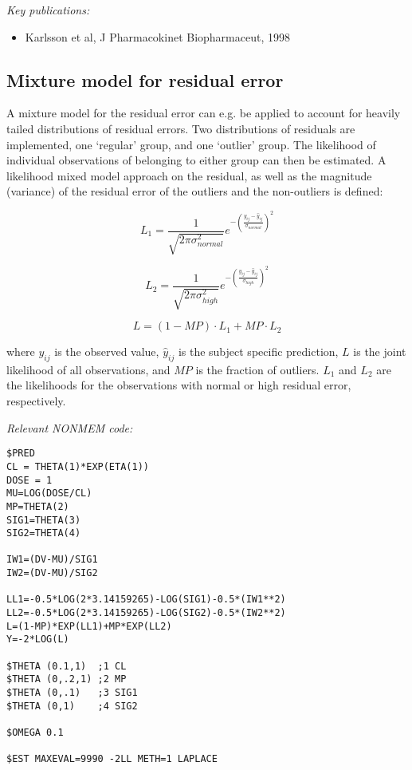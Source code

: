 \documentclass[a4paper,11pt]{article}
\begin{document}
\noindent \emph{Key publications:}
\begin{itemize}
\item Karlsson et al, J Pharmacokinet Biopharmaceut, 1998
\end{itemize}

\subsection{Mixture model for residual error}
A mixture model for the residual error can e.g. be applied to account
for heavily tailed distributions of residual errors. Two distributions
of residuals are implemented, one `regular' group, and one `outlier'
group. The likelihood of individual observations of belonging to
either group can then be estimated. A likelihood mixed model approach
on the residual, as well as the magnitude (variance) of the residual
error of the outliers and the non-outliers is defined:

\begin{equation}
L_1 = \frac{1}{\sqrt{2 \pi {\sigma^2_{normal}}}} e^{-{\left(\frac{y_{ij} - \hat{y}_{ij}}{\sigma_{normal}} \right)}^2}
\end{equation}

\begin{equation}
L_2 = \frac{1}{\sqrt{2 \pi {\sigma^2_{high}}}} e^{-{\left(\frac{y_{ij} - \hat{y}_{ij}}{\sigma_{high}} \right)}^2}
\end{equation}

\begin{equation}
L = (1-MP) \cdot L_1 + MP \cdot L_2
\end{equation}

where $y_{ij}$ is the observed value, $\hat{y}_{ij}$ is the subject specific prediction, $L$ is the joint
likelihood of all observations, and $MP$ is the fraction of outliers. $L_1$ and $L_2$ are the
likelihoods for the observations with normal or high residual error, respectively.

\noindent \emph{Relevant NONMEM code:}
\begin{lstlisting}
$PRED
CL = THETA(1)*EXP(ETA(1))
DOSE = 1
MU=LOG(DOSE/CL)
MP=THETA(2)
SIG1=THETA(3)
SIG2=THETA(4)

IW1=(DV-MU)/SIG1
IW2=(DV-MU)/SIG2

LL1=-0.5*LOG(2*3.14159265)-LOG(SIG1)-0.5*(IW1**2)
LL2=-0.5*LOG(2*3.14159265)-LOG(SIG2)-0.5*(IW2**2)
L=(1-MP)*EXP(LL1)+MP*EXP(LL2)
Y=-2*LOG(L)

$THETA (0.1,1)  ;1 CL
$THETA (0,.2,1) ;2 MP
$THETA (0,.1)   ;3 SIG1
$THETA (0,1)    ;4 SIG2

$OMEGA 0.1

$EST MAXEVAL=9990 -2LL METH=1 LAPLACE
\end{lstlisting}
\end{document}
